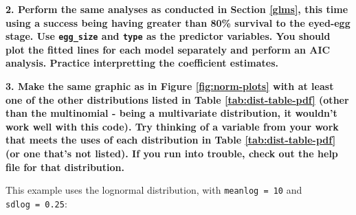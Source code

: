 \documentclass[]{book}
\newenvironment{Shaded}{\begin{snugshade}}{\end{snugshade}}
\newcommand{\DataTypeTok}[1]{\textcolor[rgb]{0.13,0.29,0.53}{#1}}
\newcommand{\DecValTok}[1]{\textcolor[rgb]{0.00,0.00,0.81}{#1}}
\newcommand{\KeywordTok}[1]{\textcolor[rgb]{0.13,0.29,0.53}{\textbf{#1}}}
\newcommand{\NormalTok}[1]{#1}
\newcommand{\OperatorTok}[1]{\textcolor[rgb]{0.81,0.36,0.00}{\textbf{#1}}}
\newcommand{\StringTok}[1]{\textcolor[rgb]{0.31,0.60,0.02}{#1}}
\begin{document}
\textbf{2. Perform the same analyses as conducted in Section \ref{glms}, this time using a success being having greater than 80\% survival to the eyed-egg stage. Use \texttt{egg\_size} and \texttt{type} as the predictor variables. You should plot the fitted lines for each model separately and perform an AIC analysis. Practice interpretting the coefficient estimates.}

\begin{Shaded}
\end{Shaded}

\textbf{3. Make the same graphic as in Figure \ref{fig:norm-plots} with at least one of the other distributions listed in Table \ref{tab:dist-table-pdf} (other than the multinomial - being a multivariate distribution, it wouldn't work well with this code). Try thinking of a variable from your work that meets the uses of each distribution in Table \ref{tab:dist-table-pdf} (or one that's not listed). If you run into trouble, check out the help file for that distribution.}

This example uses the lognormal distribution, with \texttt{meanlog\ =\ 10} and \texttt{sdlog\ =\ 0.25}:
\end{document}
